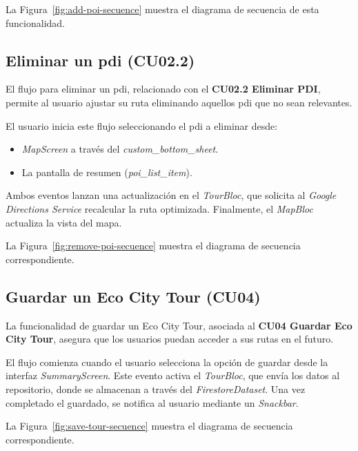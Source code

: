 La Figura~\ref{fig:add-poi-secuence} muestra el diagrama de secuencia de esta funcionalidad.


\subsection{Eliminar un \acrshort{pdi} (CU02.2)}
El flujo para eliminar un \acrshort{pdi}, relacionado con el \textbf{CU02.2 Eliminar PDI}, permite al usuario ajustar su ruta eliminando aquellos \acrshort{pdi} que no sean relevantes.

El usuario inicia este flujo seleccionando el \acrshort{pdi} a eliminar desde:
\begin{itemize}
	\item \textit{MapScreen} a través del \textit{custom\_bottom\_sheet}.
	\item La pantalla de resumen (\textit{poi\_list\_item}).
\end{itemize}
Ambos eventos lanzan una actualización en el \textit{TourBloc}, que solicita al \textit{Google Directions Service} recalcular la ruta optimizada. Finalmente, el \textit{MapBloc} actualiza la vista del mapa.

La Figura~\ref{fig:remove-poi-secuence} muestra el diagrama de secuencia correspondiente.


\subsection{Guardar un Eco City Tour (CU04)}
La funcionalidad de guardar un Eco City Tour, asociada al \textbf{CU04 Guardar Eco City Tour}, asegura que los usuarios puedan acceder a sus rutas en el futuro.

El flujo comienza cuando el usuario selecciona la opción de guardar desde la interfaz \textit{SummaryScreen}. Este evento activa el \textit{TourBloc}, que envía los datos al repositorio, donde se almacenan a través del \textit{FirestoreDataset}. Una vez completado el guardado, se notifica al usuario mediante un \textit{Snackbar}.

La Figura~\ref{fig:save-tour-secuence} muestra el diagrama de secuencia correspondiente.


